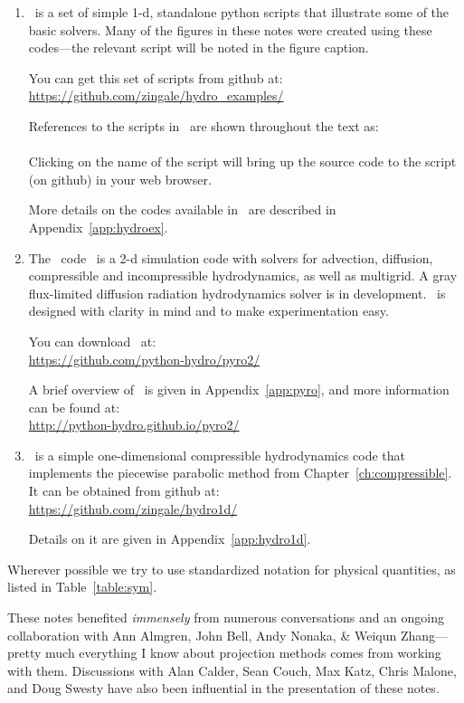 \begin{enumerate}
\item \hydroex\ is a set of simple 1-d, standalone python scripts
  that illustrate some of the basic solvers.  Many of the figures
  in these notes were created using these codes---the relevant
  script will be noted in the figure caption.

  You can get this set of scripts from github at:\\
  \url{https://github.com/zingale/hydro_examples/}

  References to the scripts in \hydroex\ are shown throughout
  the text as: \\[0.5em]
   \\[0.5em]
  Clicking on the name of the script will bring up the source code
  to the script (on github) in your web browser.

  More details on the codes available in \hydroex\ are described
  in Appendix~\ref{app:hydroex}.

\item
  The \pyro\ code~\cite{pyro} is a 2-d simulation code with
  solvers for advection, diffusion, compressible and incompressible
  hydrodynamics, as well as multigrid.  A gray flux-limited diffusion
  radiation hydrodynamics solver is
  in development.  \pyro\ is designed with clarity in mind and to make
  experimentation easy.

  You can download \pyro\ at: \\
  \url{https://github.com/python-hydro/pyro2/}

  A brief overview of \pyro\ is given in Appendix~\ref{app:pyro},
  and more information can be found at: \\
\url{http://python-hydro.github.io/pyro2/}

\item \hydrooned\ is a simple one-dimensional compressible
  hydrodynamics code that implements the piecewise parabolic method
  from Chapter~\ref{ch:compressible}.  It can be obtained from
  github at:\\
  \url{https://github.com/zingale/hydro1d/}

  Details on it are given in
  Appendix~\ref{app:hydro1d}.
\end{enumerate}

Wherever possible we try to use standardized notation for physical
quantities, as listed in Table~\ref{table:sym}.

These notes benefited {\em immensely} from numerous conversations and
an ongoing collaboration with Ann Almgren, John Bell, Andy Nonaka, \&
Weiqun Zhang---pretty much everything I know about projection methods
comes from working with them.  Discussions with Alan Calder, Sean
Couch, Max Katz, Chris Malone, and Doug Swesty have also been
influential in the presentation of these notes.

